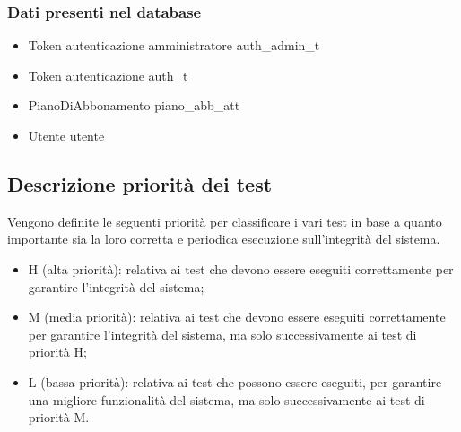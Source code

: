 \subsubsection*{Dati presenti nel database}
\begin{itemize}
    \item Token autenticazione amministratore auth\_admin\_t
    \item Token autenticazione auth\_t
    \item PianoDiAbbonamento piano\_abb\_att
    

    \item Utente utente

\end{itemize}

\subsection*{Descrizione priorità dei test}

Vengono definite le seguenti priorità per classificare i vari test in base a quanto importante sia la 
loro corretta e periodica esecuzione sull'integrità del sistema.
\begin{itemize}
    \item H (alta priorità): relativa ai test che devono essere eseguiti correttamente per garantire l'integrità
    del sistema;
    \item M (media priorità): relativa ai test che devono essere eseguiti correttamente per garantire l'integrità
    del sistema, ma solo successivamente ai test di priorità H;
    \item L (bassa priorità): relativa ai test che possono essere eseguiti, per garantire una migliore funzionalità
    del sistema, ma solo successivamente ai test di priorità M.
\end{itemize}


